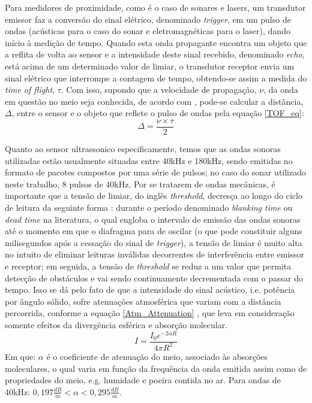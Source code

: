 Para medidores de proximidade, como é o caso de sonares e lasers, um transdutor emissor faz a conversão do sinal elétrico, denominado 
\textit{trigger}, em um pulso de ondas (acústicas para o caso do sonar e eletromagnéticas para o laser), dando início à medição de tempo.
Quando esta onda propagante encontra um objeto que a reflita de volta ao sensor e a intensidade deste sinal recebido, denominado \textit{echo}, está 
acima de um determinado valor de limiar, o transdutor receptor envia um sinal elétrico que interrompe a contagem de tempo, obtendo-se 
assim a medida do \textit{time of flight}, $\tau$.
Com isso, supondo que a velocidade de propagação, $\nu$, da onda em questão no meio seja conhecida, de acordo com \cite{siegwart}, pode-se 
calcular a distância, $\Delta$, entre o sensor e o objeto que reflete o pulso de ondas pela equação \ref{TOF_eq}:
\begin{equation}
 \label{TOF_eq}
 \Delta = \frac{\nu \times \tau }{2}
\end{equation}

Quanto ao sensor ultrassonico especificamente, temos que as ondas sonoras utilizadas estão usualmente situadas entre 40kHz e 180kHz, sendo 
emitidas no formato de pacotes compostos por uma série de pulsos; no caso do sonar utilizado neste trabalho, 8 pulsos de 40kHz. 
Por se tratarem de ondas mecânicas, é importante que a tensão de limiar, do inglês \textit{threshold}, decresça ao longo do ciclo de 
leitura da seguinte forma \cite{siegwart}: 
durante o período denominado \textit{blanking time}\cite{siegwart}  ou \textit{dead time}\cite{murphy} na literatura, o qual engloba o intervalo de 
emissão das ondas sonoras até o momento em que o 
diafragma para de oscilar (o que pode constituir alguns milisegundos após a cessação do sinal de \textit{trigger}), a tensão de limiar é muito alta 
no intuito de eliminar leituras inválidas decorrentes de interferência entre emissor e receptor; em seguida, a tensão de \textit{threshold} se reduz 
a um valor que permita detecção de obstáculos e vai sendo continuamente decrementada com o passar do tempo. 
Isso se dá pelo fato de que a intensidade do sinal acústico, i.e. potência por ângulo sólido, sofre atenuações atmosférica que variam com a 
distância percorrida, conforme a equação \ref{Atm_Attenuation} \cite{everett}, que leva em consideração somente efeitos da divergência esférica e 
absorção molecular.
\begin{equation}
 \label{Atm_Attenuation}
 I = \frac{ I_0 e^{-2 \alpha R} }{4 \pi R^2}
\end{equation}
Em que: $\alpha$ é o coeficiente de atenuação do meio, associado às absorções moleculares, o qual varia em função da frequência da onda emitida 
assim como de propriedades do meio, e.g. humidade e poeira contida no ar.
Para ondas de 40kHz: $0,197\frac{dB}{m} < \alpha < 0,295 \frac{dB}{m}$. %

